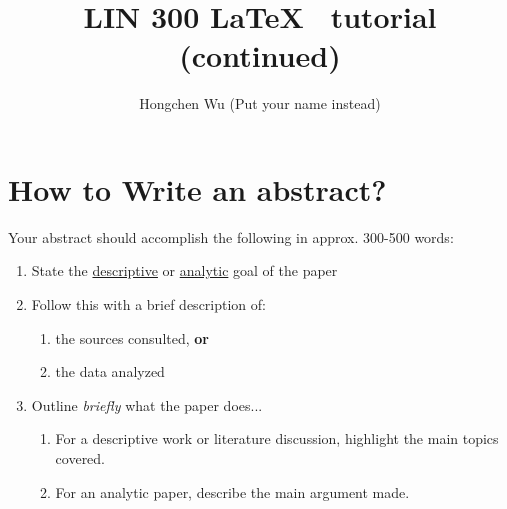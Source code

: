 \documentclass{article}
\begin{document}
			\title{LIN 300  \LaTeX~ tutorial (continued)}
			\author{Hongchen Wu (Put your name instead)}
			\maketitle
	
	\section{How to Write an abstract?}
	Your abstract should accomplish the following in approx. 300-500 words:

	\begin{enumerate}
			\item State the \underline{descriptive} or \underline{analytic} goal of the paper
		
			\item Follow this with a brief description of:
		       \begin{enumerate}
		              \item the sources consulted, \textbf{or}
		              \item the data analyzed
		       \end{enumerate}
		
		     \item Outline \textit{briefly} what the paper does...
		        \begin{enumerate}
		              \item For a descriptive work or literature discussion, highlight the main topics covered.
		              \item For an analytic paper, describe the main argument made.
		       \end{enumerate}
	\end{enumerate}
	
\end{document}
